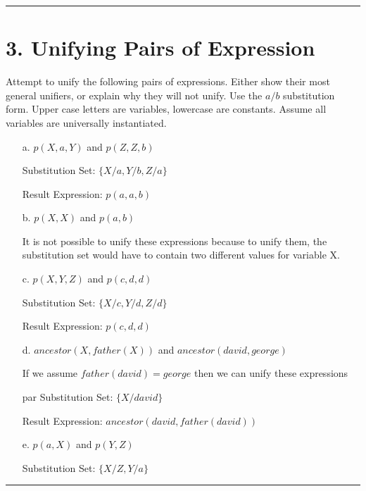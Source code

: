 \documentclass[11pt]{article}
\begin{document}
\begin{flushleft}
\begin{enumerate}
\end{enumerate}

\rule[0.1pt]{40em}{1.0pt}

\section*{3. Unifying Pairs of Expression}  Attempt to unify the following pairs
of expressions.  Either show their most general unifiers, or explain why they
will not unify. Use the ${a/b}$ substitution form. Upper case letters are
variables, lowercase are constants. Assume all variables are universally
instantiated. 

\begin{enumerate}

    \item[a.] $p(X, a, Y)$ and $p(Z, Z, b)$ \par
        Substitution Set: $\{X/a, Y/b, Z/a\}$\par
        Result Expression: $p(a, a, b)$
               
    \item[b.] $p(X, X)$ and $p(a, b)$ \par
        It is not possible to unify these expressions because to unify them,
        the substitution set would have to contain two different values for
        variable X.

    \item[c.] $p(X, Y, Z)$ and $p(c, d, d)$\par
        Substitution Set: $\{X/c, Y/d, Z/d\}$\par
        Result Expression: $p(c, d, d)$

    \item[d.] $ancestor(X, father(X))$ and $ancestor(david, george)$ \par
        If we assume $father(david) = george$ then we can unify these
        expressions \par
                par
                                Substitution Set: $\{X/david\}$\par
        Result Expression: $ancestor(david, father(david))$

    \item[e.] $p(a, X)$ and $p(Y,Z)$ \par
        Substitution Set: $ \{X/Z, Y/a\} $

\end{enumerate}

\rule[0.1pt]{40em}{1.0pt}


\end{flushleft}
\end{document}
